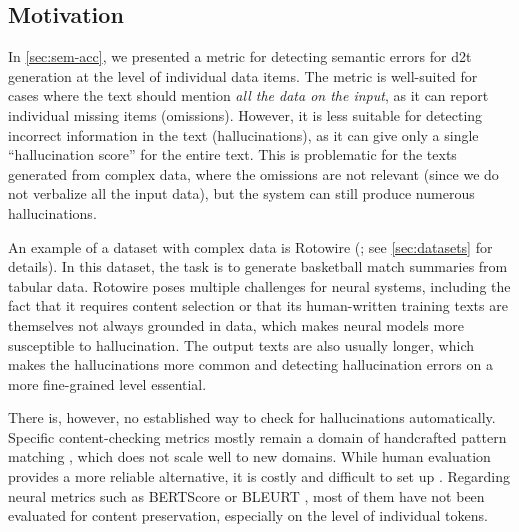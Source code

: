 \subsection{Motivation}
\label{sec:tok-acc:motivation}


In \autoref{sec:sem-acc}, we presented a metric for detecting semantic errors for \ac{d2t} generation at the level of individual data items. The metric is well-suited for cases where the text should mention \emph{all the data on the input}, as it can report individual missing items (omissions). However, it is less suitable for detecting incorrect information in the text (hallucinations), as it can give only a single ``hallucination score'' for the entire text. This is problematic for the texts generated from complex data, where the omissions are not relevant (since we do not verbalize all the input data), but the system can still produce numerous hallucinations.


An example of a dataset with complex data is Rotowire (\citealp{wiseman2017challenges}; see \autoref{sec:datasets} for details). In this dataset, the task is to generate basketball match summaries from tabular data. Rotowire poses multiple challenges for neural systems, including the fact that it requires content selection or that its human-written training texts are themselves not always grounded in data, which makes neural models more susceptible to hallucination.
The output texts are also usually longer, which makes the hallucinations more common and detecting hallucination errors on a more fine-grained level essential.

There is, however, no established way to check for hallucinations automatically. Specific content-checking metrics mostly remain a domain of handcrafted pattern matching \cite{wen2015semantically,dusekSemanticNoiseMatters2019}, which does not scale well to new domains. While human evaluation provides a more reliable alternative, it is costly and difficult to set up \cite{van2019best,belzDisentanglingPropertiesHuman2020,thomsonGoldStandardMethodology2020}. Regarding neural metrics such as BERTScore \cite{zhang2019bertscore} or BLEURT \cite{sellam2020bleurt}, most of them have not been evaluated for content preservation, especially on the level of individual tokens.


